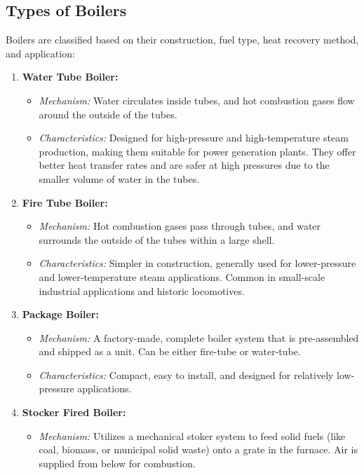 \subsection{Types of Boilers}
Boilers are classified based on their construction, fuel type, heat recovery method, and application:
\begin{enumerate}
    \item \textbf{Water Tube Boiler:}
        \begin{itemize}
            \item \textit{Mechanism:} Water circulates inside tubes, and hot combustion gases flow around the outside of the tubes.
            \item \textit{Characteristics:} Designed for high-pressure and high-temperature steam production, making them suitable for power generation plants. They offer better heat transfer rates and are safer at high pressures due to the smaller volume of water in the tubes.
        \end{itemize}
    \item \textbf{Fire Tube Boiler:}
        \begin{itemize}
            \item \textit{Mechanism:} Hot combustion gases pass through tubes, and water surrounds the outside of the tubes within a large shell.
            \item \textit{Characteristics:} Simpler in construction, generally used for lower-pressure and lower-temperature steam applications. Common in small-scale industrial applications and historic locomotives.
        \end{itemize}
    \item \textbf{Package Boiler:}
        \begin{itemize}
            \item \textit{Mechanism:} A factory-made, complete boiler system that is pre-assembled and shipped as a unit. Can be either fire-tube or water-tube.
            \item \textit{Characteristics:} Compact, easy to install, and designed for relatively low-pressure applications.
        \end{itemize}
    \item \textbf{Stocker Fired Boiler:}
        \begin{itemize}
            \item \textit{Mechanism:} Utilizes a mechanical stoker system to feed solid fuels (like coal, biomass, or municipal solid waste) onto a grate in the furnace. Air is supplied from below for combustion.

\end{itemize}
\end{enumerate}
